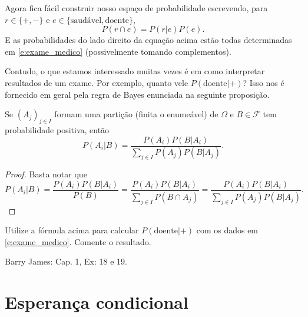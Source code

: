Agora fica fácil construir nosso espaço de probabilidade escrevendo, para $r \in \{+, -\}$ e $e \in \{\text{saudável}, \text{doente}\}$,
\begin{equation}
  P(r \cap e) = P(r | e) P(e).
\end{equation}
E as probabilidades do lado direito da equação acima estão todas determinadas em \eqref{e:exame_medico} (possivelmente tomando complementos).

Contudo, o que estamos interessado muitas vezes é em como interpretar resultados de um exame.
Por exemplo, quanto vele $P(\text{doente} | +)$?
Isso nos é fornecido em geral pela regra de Bayes enunciada na seguinte proposição.

\begin{proposition}
  Se $(A_j)_{j\in I}$ formam uma partição (finita o enumeável) de $\Omega$ e $B \in \mathcal{F}$ tem probabilidade positiva, então
  \begin{equation}
    P(A_i | B) = \frac{P(A_i) P(B | A_i)}{\sum_{j\in I} P(A_j) P(B | A_j)}.
  \end{equation}
\end{proposition}

\begin{proof}
  Basta notar que
  \begin{equation}
    P(A_i | B) = \frac{P(A_i) P(B | A_i)}{P(B)} = \frac{P(A_i) P(B | A_i)}{\sum_{j\in I} P(B \cap A_j)} = \frac{P(A_i) P(B | A_i)}{\sum_{j\in I} P(A_j) P(B | A_j)}.
  \end{equation}
\end{proof}

\begin{exercise}
  Utilize a fórmula acima para calcular $P(\text{doente} | +)$ com os dados em \eqref{e:exame_medico}.
  Comente o resultado.
\end{exercise}

\begin{exercise}
  Barry James: Cap. 1, Ex: 18 e 19.
\end{exercise}




\chapter{Esperança condicional}

